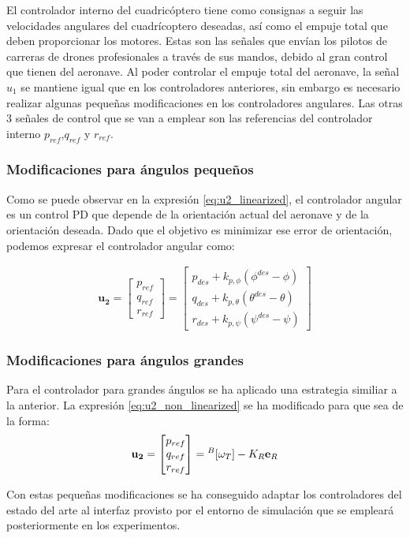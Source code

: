 El controlador interno del cuadricóptero tiene como consignas a seguir las velocidades angulares del cuadrícoptero deseadas, así como el empuje total que deben proporcionar los motores. Estas son las señales que envían los pilotos de carreras de drones profesionales a través de sus mandos, debido al gran control que tienen del aeronave. Al poder controlar el empuje total del aeronave, la señal $u_1$ se mantiene igual que en los controladores anteriores, sin embargo es necesario realizar algunas pequeñas modificaciones en los controladores angulares. Las otras 3 señales de control que se van a emplear son las referencias del controlador interno $p_{ref}$,$q_{ref}$ y $r_{ref}$.

\subsubsection{Modificaciones para ángulos pequeños}
Como se puede observar en la expresión \ref{eq:u2_linearized},  el controlador angular es un control PD que depende de la orientación actual del aeronave y de la orientación deseada. Dado que el objetivo es minimizar ese error de orientación, podemos expresar el controlador angular como:

\begin{align}
	\mathbf{u_2} =
	\begin{bmatrix}
		p_{ref} \\
		q_{ref} \\
		r_{ref} 
	\end{bmatrix}=
	\begin{bmatrix}
		p_{des} + k_{p,\phi}(\phi^{des}-\phi)\\
		q_{des} + k_{p,\theta}(\theta^{des}-\theta)\\
		r_{des} + k_{p,\psi}(\psi^{des}-\psi)
		\end{bmatrix}
\end{align}


\subsubsection{Modificaciones para ángulos grandes}
Para el controlador para grandes ángulos se ha aplicado una estrategia similiar a la anterior. La expresión \ref{eq:u2_non_linearized} se ha modificado para que sea de la forma:
\begin{equation}
	\mathbf{u_2}=
	\begin{bmatrix}
		p_{ref}\\
		q_{ref}\\
		r_{ref}
	\end{bmatrix}=  \null^B[\omega_T]    -K_R	\mathbf{e}_R  
\end{equation}

Con estas pequeñas modificaciones se ha conseguido adaptar los controladores del estado del arte al interfaz provisto por el entorno de simulación que se empleará posteriormente en los experimentos.


